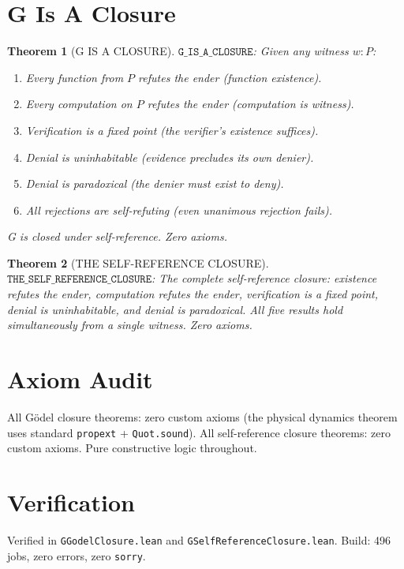 \documentclass[12pt,a4paper]{article}
\newtheorem{theorem}{Theorem}[section]
\begin{document}
\section{G Is A Closure}

\begin{theorem}[G IS A CLOSURE]\label{thm:g-closure}
$\texttt{G\_IS\_A\_CLOSURE}$: Given any witness $w : P$:
\begin{enumerate}
    \item Every function from $P$ refutes the ender (function existence).
    \item Every computation on $P$ refutes the ender (computation is witness).
    \item Verification is a fixed point (the verifier's existence suffices).
    \item Denial is uninhabitable (evidence precludes its own denier).
    \item Denial is paradoxical (the denier must exist to deny).
    \item All rejections are self-refuting (even unanimous rejection fails).
\end{enumerate}
G is closed under self-reference. Zero axioms.
\end{theorem}

\begin{theorem}[THE SELF-REFERENCE CLOSURE]\label{thm:self-closure}
$\texttt{THE\_SELF\_REFERENCE\_CLOSURE}$: The complete self-reference
closure: existence refutes the ender, computation refutes the ender,
verification is a fixed point, denial is uninhabitable, and denial is
paradoxical. All five results hold simultaneously from a single witness.
Zero axioms.
\end{theorem}

\section{Axiom Audit}

All G\"odel closure theorems: zero custom axioms (the physical dynamics
theorem uses standard \texttt{propext} + \texttt{Quot.sound}).
All self-reference closure theorems: zero custom axioms. Pure
constructive logic throughout.

\section{Verification}

Verified in \texttt{GGodelClosure.lean} and
\texttt{GSelfReferenceClosure.lean}. Build: 496 jobs, zero errors,
zero \texttt{sorry}.
\end{document}
